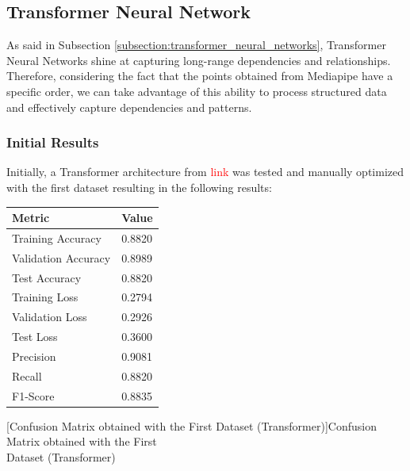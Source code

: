 \subsection{Transformer Neural Network}

As said in Subsection \ref{subsection:transformer_neural_networks}, Transformer Neural Networks shine at capturing long-range dependencies and relationships. Therefore, considering the fact that the points obtained from Mediapipe have a specific order, we can take advantage of this ability to process structured data and effectively capture dependencies and patterns.

\subsubsection{Initial Results}

Initially, a Transformer architecture from \textcolor{red}{link} was tested and manually optimized with the first dataset resulting in the following results:

\begin{minipage}{0.35\textwidth}
    \centering
    \captionsetup{justification=centering}
    \label{table:transformer_dataset1_results}
    \begin{tabular}{ |l|l| }
    \hline
    Metric & Value \\
    \hline
    Training Accuracy & 0.8820 \\
    \hline
    Validation Accuracy & 0.8989 \\
    \hline
    Test Accuracy & 0.8820 \\
    \hline
    Training Loss & 0.2794 \\
    \hline
    Validation Loss & 0.2926 \\
    \hline
    Test Loss & 0.3600 \\
    \hline
    Precision & 0.9081 \\
    \hline
    Recall & 0.8820 \\
    \hline
    F1-Score & 0.8835 \\
    \hline
    \end{tabular}
\end{minipage}%
\begin{minipage}{0.65\textwidth}
    \centering
    \captionsetup{justification=centering}
    
    [Confusion Matrix obtained with the First Dataset (Transformer)]{Confusion Matrix obtained with the First\\Dataset (Transformer)}
    \label{fig:transformer_dataset1_confusion_matrix}
\end{minipage}


